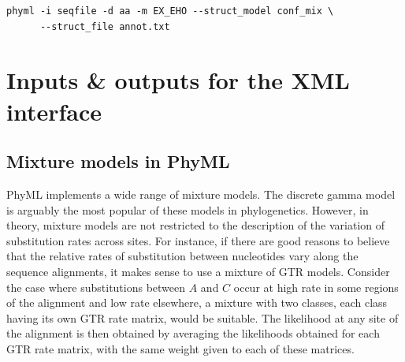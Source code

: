 \documentclass[a4paper,12pt]{article}
\begin{document}
\begin{verbatim}
phyml -i seqfile -d aa -m EX_EHO --struct_model conf_mix \
      --struct_file annot.txt
\end{verbatim}

\section{Inputs \& outputs for the XML interface }\label{sec:xmlio}

\subsection{Mixture models in PhyML}\label{sec:mixtures}

PhyML implements a wide range of mixture models. The discrete gamma model \cite{yang94b} is arguably
the  most popular  of these  models in  phylogenetics. However,  in theory,  mixture models  are not
restricted to the description of the variation  of substitution rates across sites. For instance, if
there are good reasons  to believe that the relative rates of  substitution between nucleotides vary
along the  sequence alignments, it  makes sense to  use a mixture of  GTR models. Consider  the case
where substitutions between $A$ and $C$ occur at  high rate in some regions of the alignment and low
rate elsewhere,  a mixture with two  classes, each class having  its own GTR rate  matrix, would be
suitable. The likelihood at any site of  the alignment is then obtained by averaging the likelihoods
obtained for each GTR rate matrix, with the same weight given to each of these matrices.
\end{document}
